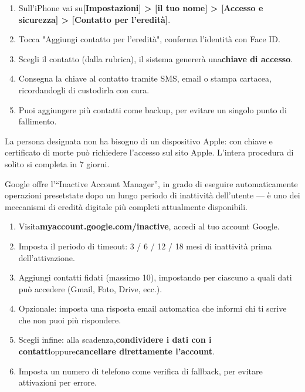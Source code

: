 \begin{enumerate}
  \item Sull'iPhone vai su\textbf{[Impostazioni] > [il tuo nome] > [Accesso e sicurezza] > [Contatto per l'eredità]}.
  \item Tocca "Aggiungi contatto per l'eredità", conferma l'identità con Face ID.
  \item Scegli il contatto (dalla rubrica), il sistema genererà una\textbf{chiave di accesso}.
  \item Consegna la chiave al contatto tramite SMS, email o stampa cartacea, ricordandogli di custodirla con cura.
  \item Puoi aggiungere più contatti come backup, per evitare un singolo punto di fallimento.
\end{enumerate}

La persona designata non ha bisogno di un dispositivo Apple: con chiave e certificato di morte può richiedere l'accesso sul sito Apple. L'intera procedura di solito si completa in 7 giorni.


Google offre l'“Inactive Account Manager”, in grado di eseguire automaticamente operazioni presetstate dopo un lungo periodo di inattività dell'utente — è uno dei meccanismi di eredità digitale più completi attualmente disponibili.

\begin{enumerate}
  \item Visita\textbf{myaccount.google.com/inactive}, accedi al tuo account Google.
  \item Imposta il periodo di timeout: 3 / 6 / 12 / 18 mesi di inattività prima dell'attivazione.
  \item Aggiungi contatti fidati (massimo 10), impostando per ciascuno a quali dati può accedere (Gmail, Foto, Drive, ecc.).
  \item Opzionale: imposta una risposta email automatica che informi chi ti scrive che non puoi più rispondere.
  \item Scegli infine: alla scadenza,\textbf{condividere i dati con i contatti}oppure\textbf{cancellare direttamente l'account}.
  \item Imposta un numero di telefono come verifica di fallback, per evitare attivazioni per errore.
\end{enumerate}


